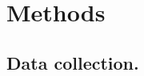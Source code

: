\section*{Methods}\label{sec:methods} %
  \begin{small} %
\subsection*{\small Data collection.} %


\end{small}
